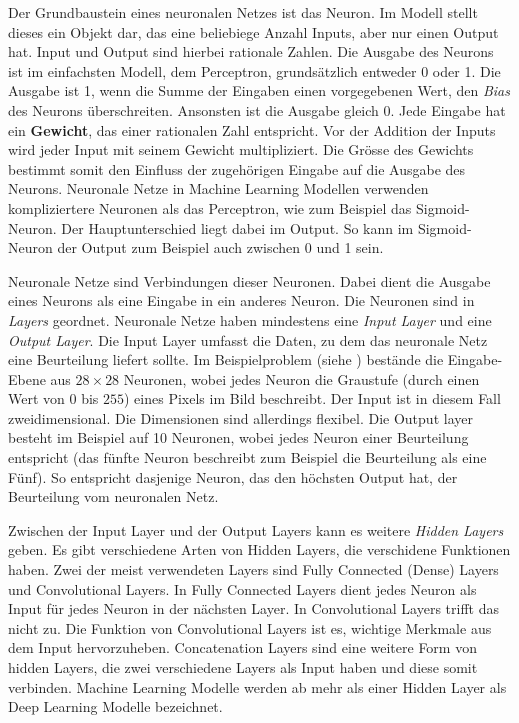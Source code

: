 Der Grundbaustein eines neuronalen Netzes ist das Neuron. Im Modell stellt
dieses ein Objekt dar, das eine beliebiege Anzahl Inputs, aber nur einen Output
hat. Input und Output sind hierbei rationale Zahlen. Die Ausgabe des Neurons ist
im einfachsten Modell, dem Perceptron, grundsätzlich entweder 0 oder 1. Die
Ausgabe ist 1, wenn die Summe der Eingaben einen vorgegebenen Wert, den
\emph{Bias} des Neurons überschreiten. Ansonsten ist die Ausgabe gleich 0. Jede
Eingabe hat ein \textbf{Gewicht}, das einer rationalen Zahl entspricht. Vor der
Addition der Inputs wird jeder Input mit seinem Gewicht multipliziert.  Die
Grösse des Gewichts bestimmt somit den Einfluss der zugehörigen Eingabe auf die
Ausgabe des Neurons. Neuronale Netze in Machine Learning Modellen verwenden
kompliziertere Neuronen als das Perceptron, wie zum Beispiel das Sigmoid-Neuron.
Der Hauptunterschied liegt dabei im Output. So kann im Sigmoid-Neuron der Output
zum Beispiel auch zwischen 0 und 1 sein.

Neuronale Netze sind Verbindungen dieser Neuronen. Dabei dient die Ausgabe eines
Neurons als eine Eingabe in ein anderes Neuron. Die Neuronen sind in
\emph{Layers} geordnet. Neuronale Netze haben mindestens eine \emph{Input Layer}
und eine \emph{Output Layer}. Die Input Layer umfasst die Daten, zu dem das
neuronale Netz eine Beurteilung liefert sollte. Im Beispielproblem (siehe
) bestände die Eingabe-Ebene aus $28\times28$ Neuronen, wobei
jedes Neuron die Graustufe (durch einen Wert von 0 bis $255$) eines Pixels im
Bild beschreibt. Der Input ist in diesem Fall zweidimensional. Die Dimensionen
sind allerdings flexibel. Die Output layer besteht im Beispiel auf 10 Neuronen,
wobei jedes Neuron einer Beurteilung entspricht (das fünfte Neuron beschreibt
zum Beispiel die Beurteilung als eine Fünf). So entspricht dasjenige Neuron, das
den höchsten Output hat, der Beurteilung vom neuronalen Netz.

Zwischen der Input Layer und der Output Layers kann es weitere \emph{Hidden
Layers} geben. Es gibt verschiedene Arten von Hidden Layers, die verschidene
Funktionen haben. Zwei der meist verwendeten Layers sind Fully Connected (Dense)
Layers und Convolutional Layers. In Fully Connected Layers dient jedes Neuron
als Input für jedes Neuron in der nächsten Layer. In Convolutional Layers trifft
das nicht zu. Die Funktion von Convolutional Layers ist es, wichtige Merkmale
aus dem Input hervorzuheben. Concatenation Layers sind eine weitere Form von
hidden Layers, die zwei verschiedene Layers als Input haben und diese somit
verbinden. Machine Learning Modelle werden ab mehr als einer Hidden Layer als
Deep Learning Modelle bezeichnet.



